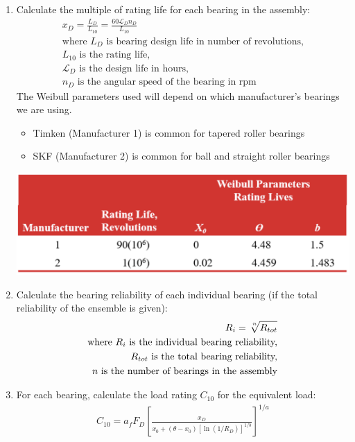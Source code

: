 \documentclass[11pt, fleqn]{article}
\begin{document}
\begin{enumerate}
    \item Calculate the multiple of rating life for each bearing in the assembly:
    \begin{align*}
        x_D = \frac{L_D}{L_{10}} = \frac{60\mathscr{L}_Dn_D}{L_{10}}\\
        \text{where $L_D$ is bearing design life in number of revolutions,}\\
        \text{$L_{10}$ is the rating life,}\\
        \text{$\mathscr{L}_D$ is the design life in hours,}\\
        \text{$n_D$ is the angular speed of the bearing in rpm}
    \end{align*}
    The Weibull parameters used will depend on which manufacturer's bearings we are using. 
    \begin{itemize}
        \item Timken (Manufacturer 1) is common for tapered roller bearings
        \item SKF (Manufacturer 2) is common for ball and straight roller bearings
    \end{itemize}
    \includegraphics[scale=0.35]{Bearings/weibull-parameters.png}
    \item Calculate the bearing reliability of each individual bearing (if the total reliability of the ensemble is given):
    \begin{align*}
        R_i = \sqrt[\leftroot{-2}\uproot{2}n]{R_{tot}}\\
        \text{where $R_i$ is the individual bearing reliability,}\\
        \text{$R_{tot}$ is the total bearing reliability,}\\
        \text{$n$ is the number of bearings in the assembly}
    \end{align*}
    \item For each bearing, calculate the load rating $C_{10}$ for the equivalent load:
    \begin{align*}
        C_{10} = a_f F_D \left[ \frac{x_D}{x_0+(\theta - x_0)[\ln{(1/R_D)}]^{1/b}} \right]^{1/a}
    \end{align*}

\end{enumerate}
\end{document}
